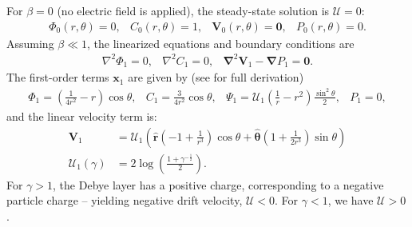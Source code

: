 \documentclass[MSc,beforeExam]{iitcsthesis}
\newcommand{\pars}[1]{\left(#1\right)}
\newcommand\Laplacian{\nabla^2}
\newcommand\bnabla{\boldsymbol{\nabla}}
\newcommand\bLaplacian{\boldsymbol{\nabla}^2}
\newcommand\bV{\boldsymbol{V}}
\newcommand\bx{\boldsymbol{x}}
\newcommand\br{\boldsymbol{r}}
\newcommand\brhat{\hat{\br}}
\newcommand\btheta{\boldsymbol{\theta}}
\newcommand\bthetahat{\hat{\btheta}}
\newcommand\bzero{\boldsymbol{0}}
\newcommand\cU{\mathscr{U}}
\begin{document}
For $\beta = 0$ (no electric field is applied), the steady-state solution is $\cU = 0$:
\begin{equation}\begin{array}{cccc}
\varPhi_0(r,\theta) = 0, &
C_0(r,\theta) = 1, &
\bV_0(r,\theta) = \bzero, &
P_0(r,\theta) = 0.
\end{array}\end{equation}
Assuming $\beta \ll 1$, the linearized equations and boundary conditions are
\begin{equation} \begin{array}{ccc}
\Laplacian \varPhi_1 = 0, &
\Laplacian C_1 = 0, &
\bLaplacian \bV_1 - \bnabla P_1 = \bzero.
\end{array}\end{equation}
The first-order terms $\bx_1$ are given by (see \cite{yariv2010migration} for full derivation)
\begin{equation} \begin{array}{cccc}
\varPhi_1 = \pars{\frac{1}{4r^2} - r}\cos\theta, &
C_1 = \frac{3}{4r^2} \cos\theta, &
\Psi_1 = \cU_1 \pars{\frac{1}{r} - r^2} \frac{\sin^2\theta}{2}, &
P_1 = 0,
\end{array} \end{equation}
and the linear velocity term is:
\begin{align} \label{eq:linear_velocity}
\bV_1 &= \cU_1 \pars{ \brhat \pars{-1 + \frac{1}{r^3}}\cos\theta 
+ \bthetahat \pars{1 + \frac{1}{2r^3}} \sin\theta } \\
\cU_1(\gamma) &= 2 \log \pars{\frac{1 + \gamma^{-\frac{1}{2}}}{2}}.
\end{align}
For $\gamma > 1$, the Debye layer has a positive charge, 
corresponding to a negative particle charge -- 
yielding negative drift velocity, $\cU < 0$. 
For $\gamma < 1$, we have $\cU > 0$.

\end{document}
